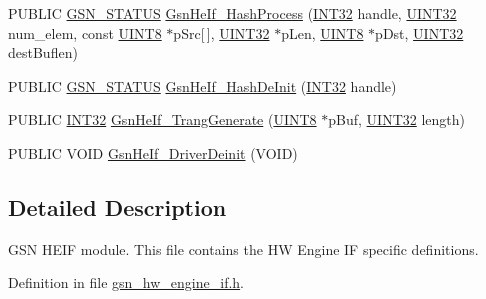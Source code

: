 \begin{DoxyCompactItemize}
\item 
PUBLIC \hyperlink{a00660_gada5951904ac6110b1fa95e51a9ddc217}{GSN\_\-STATUS} \hyperlink{a00515_a9d2d2836900aac1e510334558bfb1968}{GsnHeIf\_\-HashProcess} (\hyperlink{a00660_ga63021d67d54286c2163bcdb43a6f2569}{INT32} handle, \hyperlink{a00660_gae1e6edbbc26d6fbc71a90190d0266018}{UINT32} num\_\-elem, const \hyperlink{a00660_gab27e9918b538ce9d8ca692479b375b6a}{UINT8} $\ast$pSrc\mbox{[}$\,$\mbox{]}, \hyperlink{a00660_gae1e6edbbc26d6fbc71a90190d0266018}{UINT32} $\ast$pLen, \hyperlink{a00660_gab27e9918b538ce9d8ca692479b375b6a}{UINT8} $\ast$pDst, \hyperlink{a00660_gae1e6edbbc26d6fbc71a90190d0266018}{UINT32} destBuflen)
\item 
PUBLIC \hyperlink{a00660_gada5951904ac6110b1fa95e51a9ddc217}{GSN\_\-STATUS} \hyperlink{a00515_adf6fefbded5b91ff78abe169efaeeaca}{GsnHeIf\_\-HashDeInit} (\hyperlink{a00660_ga63021d67d54286c2163bcdb43a6f2569}{INT32} handle)
\item 
PUBLIC \hyperlink{a00660_ga63021d67d54286c2163bcdb43a6f2569}{INT32} \hyperlink{a00515_a2f28d0043a37512b3888c93a069630a6}{GsnHeIf\_\-TrangGenerate} (\hyperlink{a00660_gab27e9918b538ce9d8ca692479b375b6a}{UINT8} $\ast$pBuf, \hyperlink{a00660_gae1e6edbbc26d6fbc71a90190d0266018}{UINT32} length)
\item 
PUBLIC VOID \hyperlink{a00515_a6684b0bb0468e7bfeacb71d8a2a8d19d}{GsnHeIf\_\-DriverDeinit} (VOID)
\end{DoxyCompactItemize}


\subsection{Detailed Description}
GSN HEIF module. This file contains the HW Engine IF specific definitions. 

Definition in file \hyperlink{a00515_source}{gsn\_\-hw\_\-engine\_\-if.h}.



